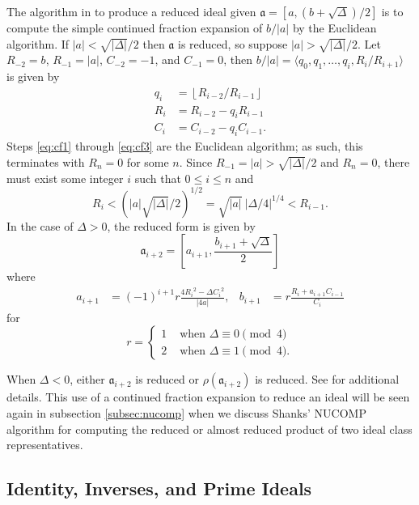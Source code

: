 \documentclass{ucalgthes1}
\theoremstyle{plain}
\theoremstyle{definition}
\newcommand{\floor}[1]{\left\lfloor #1 \right\rfloor}
\begin{document}
The algorithm in \cite[pp.104-105]{Jac09} to produce a reduced ideal given $\mathfrak a = [a, (b+\sqrt\Delta)/2]$ is to compute the simple continued fraction expansion of $b/|a|$ by the Euclidean algorithm.  If $|a| < \sqrt{|\Delta|}/2$ then $\mathfrak a$ is reduced, so suppose $|a| > \sqrt{|\Delta|}/2$.  Let $R_{-2}=b$, $R_{-1}=|a|$, $C_{-2}=-1$, and $C_{-1} = 0$, then $b/|a| = \langle q_0, q_1, \dots, q_i, R_i/R_{i+1} \rangle$ is given by
\begin{align}
	q_i &= \floor{ R_{i-2}/R_{i-1} } \label{eq:cf1} \\
	R_i &= R_{i-2} - q_i R_{i-1} \label{eq:cf2} \\
	C_i &= C_{i-2} - q_i C_{i-1}. \label{eq:cf3}
\end{align}
Steps \eqref{eq:cf1} through \eqref{eq:cf3} are the Euclidean algorithm; as such, this terminates with $R_n = 0$ for some $n$.  Since $R_{-1} = |a| > \sqrt{|\Delta|}/2$ and $R_n = 0$, there must exist some integer $i$ such that $0 \le i \le n$ and 
\[
	R_i < \left(|a|\sqrt{|\Delta|}/2\right)^{1/2} = \sqrt{|a|} ~ {|\Delta/4|}^{1/4} < R_{i-1}.
\]
In the case of $\Delta>0$, the reduced form is given by
\[
	{\mathfrak a}_{i+2} = \left[ a_{i+1}, \frac{b_{i+1} + \sqrt\Delta}{2} \right]
\]
where
\begin{align*}
	a_{i+1} &= (-1)^{i+1} r\frac{ 4{R_i}^2 -\Delta{C_i}^2 }{|4a|}, &
	b_{i+1} &= r\frac{R_i + a_{i+1}C_{i-1}}{C_i}
\end{align*}
for
\[
	r = \begin{cases}
		1 & \mbox{ when } \Delta \equiv 0 \pmod 4 \\
		2 & \mbox{ when } \Delta \equiv 1 \pmod 4.
	\end{cases}
\]

\noindent
When $\Delta<0$, either ${\mathfrak a}_{i+2}$ is reduced or $\rho({\mathfrak a}_{i+2})$ is reduced.  See \cite[pp.~104-106]{Jac09} for additional details.  This use of a continued fraction expansion to reduce an ideal will be seen again in subsection \ref{subsec:nucomp} when we discuss Shanks' NUCOMP algorithm for computing the reduced or almost reduced product of two ideal class representatives.


\subsection{Identity, Inverses, and Prime Ideals}\label{subsec:iipIdeals}
\end{document}
